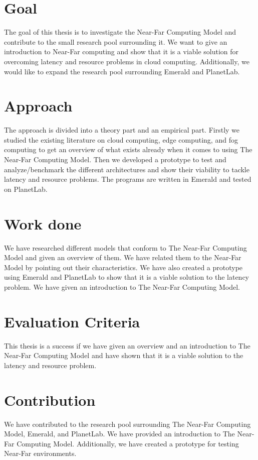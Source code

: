 \section{Goal}
The goal of this thesis is to investigate the Near-Far Computing Model and contribute to the small research pool surrounding it. We want to give an introduction to Near-Far computing and show that it is a viable solution for overcoming latency and resource problems in cloud computing. Additionally, we would like to expand the research pool surrounding Emerald and PlanetLab.

\section{Approach}
The approach is divided into a theory part and an empirical part. Firstly we studied the existing literature on cloud computing, edge computing, and fog computing to get an overview of what exists already when it comes to using The Near-Far Computing Model. Then we developed a prototype to test and analyze/benchmark the different architectures and show their viability to tackle latency and resource problems. The programs are written in Emerald and tested on PlanetLab.


\section{Work done}
We have researched different models that conform to The Near-Far Computing Model and given an overview of them. We have related them to the Near-Far Model by pointing out their characteristics. We have also created a prototype using Emerald and PlanetLab to show that it is a viable solution to the latency problem. We have given an introduction to The Near-Far Computing Model.

\section{Evaluation Criteria}
This thesis is a success if we have given an overview and an introduction to The Near-Far Computing Model and have shown that it is a viable solution to the latency and resource problem.

\section{Contribution}
We have contributed to the research pool surrounding The Near-Far Computing Model, Emerald, and PlanetLab. We have provided an introduction to The Near-Far Computing Model. Additionally, we have created a prototype for testing Near-Far environments. 

